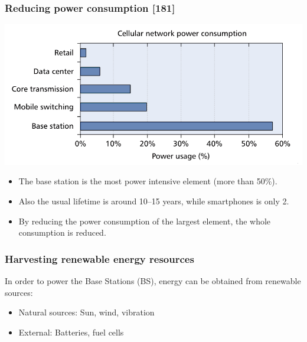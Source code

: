 \documentclass[a4paper,11pt,handout]{beamer}
\begin{document}
\begin{frame}
\frametitle{Reducing power consumption [181]}
	\begin{center}
	\includegraphics[scale=1]{consumption.png}
	\end{center}

\begin{itemize}

	\item The base station is the most power intensive element (more than 50\%).
	\item Also the usual lifetime is around 10--15 years, while smartphones is only 2.
	\item By reducing the power consumption of the largest element, the whole 
	consumption is reduced.

\end{itemize}
\end{frame}
\note{

}
\begin{frame}
\frametitle{Harvesting renewable energy resources}
In order to power the Base Stations (BS), energy can be obtained from renewable 
sources:

\begin{itemize}
\item Natural sources: Sun, wind, vibration
\item External: Batteries, fuel cells
\end{itemize}
\end{frame}
\end{document}
